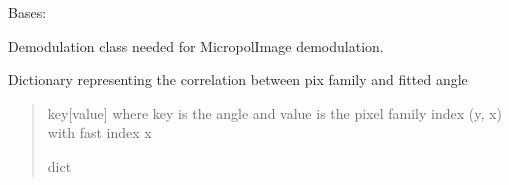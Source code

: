 \documentclass[letterpaper,10pt,english]{sphinxmanual}
\begin{document}
\begin{fulllineitems}
\label{\detokenize{micropolarray.processing:micropolarray.processing.demodulation.Demodulator}}
\pysigstartsignatures
{}
\pysigstopsignatures
\sphinxAtStartPar
Bases: 

\sphinxAtStartPar
Demodulation class needed for MicropolImage
demodulation.

\begin{fulllineitems}
\label{\detokenize{micropolarray.processing:micropolarray.processing.demodulation.Demodulator.Cij}}
\pysigstartsignatures
{}
\pysigstopsignatures
\end{fulllineitems}


\begin{fulllineitems}
\label{\detokenize{micropolarray.processing:micropolarray.processing.demodulation.Demodulator.angle_dic}}
\pysigstartsignatures
{}
\pysigstopsignatures
\sphinxAtStartPar
Dictionary representing the correlation between pix family and fitted angle
\begin{quote}\begin{description}
\sphinxAtStartPar
key{[}value{]} where key is the angle and value is the pixel family index (y, x) with fast index x

\sphinxAtStartPar
dict

\end{description}\end{quote}

\end{fulllineitems}


\end{fulllineitems}
\end{document}
